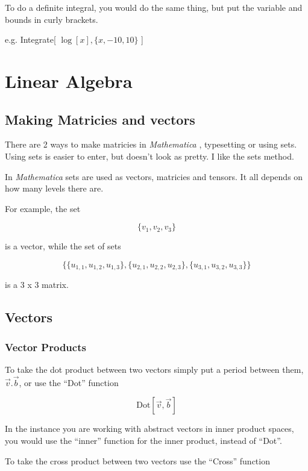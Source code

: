 \documentclass[11pt,letterpaper,twoside,titlepage]{report}
\newcommand{\Mathematica}{\textit{Mathematica} }
\begin{document}
				To do a definite integral, you would do the same thing, but put the variable and bounds in curly brackets. 
						
				e.g. Integrate[ $ \log[x], \{ x,-10,10 \} $ ]
						
		\chapter{Linear Algebra}
		
			\section{Making Matricies and vectors}
					
				There are 2 ways to make matricies in \Mathematica, typesetting or using sets.  Using sets is easier to enter, but doesn't look as pretty.  I like the sets method.
				
				In \Mathematica sets are used as vectors, matricies and tensors.  It all depends on how many levels there are.
				
				For example, the set 
				
				\[ \{ v_1 , v_2 , v_3 \} \]
				
				is a vector, while the set of sets
				
				\[ \{ \{ u_{1,1} , u_{1,2} , u_{1,3} \} , \{ u_{2,1} , u_{2,2} , u_{2,3} \} , \{ u_{3,1} , u_{3,2} , u_{3,3} \} \} \]
				
				is a 3 x 3 matrix.
		
			\section{Vectors}
			
				\subsection{Vector Products}
				
					To take the dot product between two vectors simply put a period between them, $\vec{v} . \vec{b}$, or use the ``Dot'' function
					
					\[ \text{Dot} [ \vec{v}, \vec{b} ] \]
					
					In the instance you are working with abstract vectors in inner product spaces, you would use the ``inner'' function for the inner product, instead of ``Dot''.
					
					To take the cross product between two vectors use the ``Cross'' function
					
\end{document}

